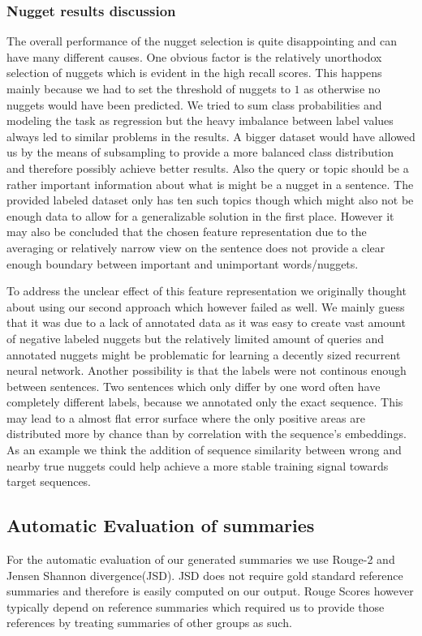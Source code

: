 \documentclass{article}
\begin{document}
\subsubsection{Nugget results discussion}
The overall performance of the nugget selection is quite disappointing and can have many different causes. One obvious factor is the relatively unorthodox selection of nuggets which is evident in the high recall scores. This happens mainly because we had to set the threshold of nuggets to $1$ as otherwise no nuggets would have been predicted. We tried to sum class probabilities and modeling the task as regression but the heavy imbalance between label values always led to similar problems in the results. A bigger dataset would have allowed us by the means of subsampling to provide a more balanced class distribution and therefore possibly achieve better results. Also the query or topic should be a rather important information about what is might be a nugget in a sentence. The provided labeled dataset only has ten such topics though which might also not be enough data to allow for a generalizable solution in the first place.  However it may also be concluded that the chosen feature representation due to the averaging or relatively narrow view on the sentence does not provide a clear enough boundary between important and unimportant words/nuggets.

To address the unclear effect of this feature representation we originally thought about using our second approach which however failed as well. We mainly guess that it was due to a lack of annotated data as it was easy to create vast amount of negative labeled nuggets but the relatively limited amount of queries and annotated nuggets might be problematic for learning a decently sized recurrent neural network. Another possibility is that the labels were not continous enough between sentences. Two sentences which only differ by one word often have completely different labels, because we annotated only the exact sequence. This may lead to a almost flat error surface where the only positive areas are distributed more by chance than by correlation with the sequence's embeddings. As an example we think the addition of sequence similarity between wrong and nearby true nuggets could help achieve a more stable training signal towards target sequences.
\subsection{Automatic Evaluation of summaries}
For the automatic evaluation of our generated summaries we use Rouge-2 and Jensen Shannon divergence(JSD). JSD does not require gold standard reference summaries and therefore is easily computed on our output. Rouge Scores however typically depend on reference summaries which required us to provide those references by treating summaries of other groups as such. 
\end{document}
